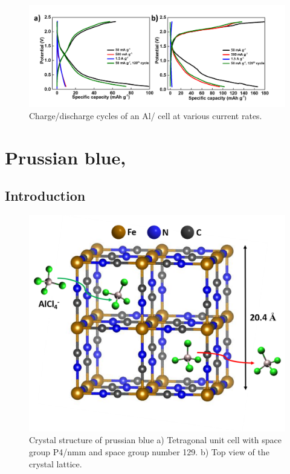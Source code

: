 \begin{figure}[th!]
\centering
\includegraphics[width=\textwidth]{Figures/chap6fig/C3N4cdc}
\caption{Charge/discharge cycles of an Al/ cell at various current rates.}
\label{Figures/chap6fig:C3N4cdc}
\end{figure}

\section{Prussian blue, }

\subsection{Introduction}

 \begin{figure}[tbh!]
  \centering
  \includegraphics[width=\textwidth]{Figures/chap6fig/pbcrys}
    \caption{Crystal structure of prussian blue a) Tetragonal unit cell with space group P4/nmm and space group number 129. b) Top view of the crystal lattice.}
  \label{Figures/chap6fig:pbcrys}
\end{figure}

